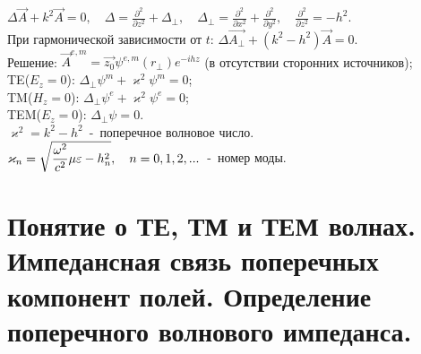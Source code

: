 \begin{multicols*}{2}
		$\Delta \vec{A}+k^2\vec{A}=0, \quad \Delta=\frac{\partial^2}{\partial z^2}+\Delta_\perp,\quad \Delta_\perp=\frac{\partial^2}{\partial x^2}+\frac{\partial^2}{\partial y^2},\quad \frac{\partial^2}{\partial z^2}=-h^2$. \\
		При гармонической зависимости от $t$: $\Delta \vec{A_\perp}+(k^2-h^2)\vec{A}=0$.\\
		Решение: $\vec{A}^{e,m}=\vec{z_0}\psi^{e,m}(r_\perp)e^{-ihz}$ (в отсутствии сторонних источников); \\
		TE($ E_z=0 $): $ \Delta_\perp\psi^m+\varkappa^2\psi^m=0 $; \\
		TM($ H_z=0 $): $ \Delta_\perp\psi^e+\varkappa^2\psi^e=0 $; \\
		TEM($ E_z=0 $): $ \Delta_\perp\psi=0 $.\\
		$\varkappa^2=k^2-h^2$~-~поперечное волновое число. \\
		$\varkappa_n=\sqrt{\dfrac{\omega^2}{c^2}\mu\varepsilon-h_n^2}, \quad n=0,1,2,...$~-~номер моды.
		
		\section{Понятие о ТЕ, ТМ и ТЕМ волнах. Импедансная связь поперечных компонент полей. Определение поперечного волнового импеданса. }
		

\end{multicols*}
